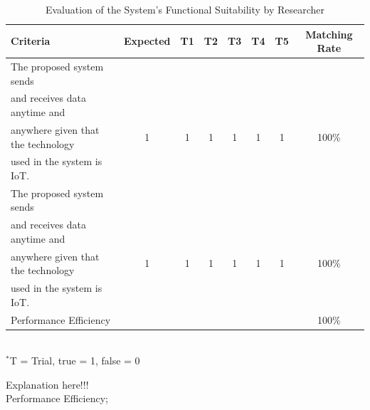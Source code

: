 \begin{table}[h!]
\caption{Evaluation of the System’s Functional Suitability by Researcher}
\vspace{-1em}
\begin{center}
\fontsize{10}{12}\selectfont
\begin{tabular}{|| l c c c c c c c ||} 
 \hline
 Criteria & Expected & T1 & T2 & T3 & T4 & T5 & Matching Rate \\ [0.5ex] 
 \hline\hline
The proposed system sends &  &  &  &  &  &  &  \\
and receives data anytime and &  &  &  &  &  &  &  \\
anywhere given that the technology & 1 & 1 & 1 & 1 & 1 & 1 & 100\% \\
used in the system is IoT. &  &  &  &  &  &  &  \\ 
\hline
The proposed system sends &  &  &  &  &  &  &  \\
and receives data anytime and &  &  &  &  &  &  &  \\
anywhere given that the technology & 1 & 1 & 1 & 1 & 1 & 1 & 100\% \\
used in the system is IoT. &  &  &  &  &  &  &  \\ 
\hline
Performance Efficiency &  &  &  &  &  &  & 100\% \\ 
\hline
\end{tabular} \\
\footnotesize{\hspace{-10cm}$^*$T = Trial, true = 1, false = 0}
\end{center}
\end{table} 

Explanation here!!! \lipsum[1] \\

\indent\indent Performance Efficiency; \\

